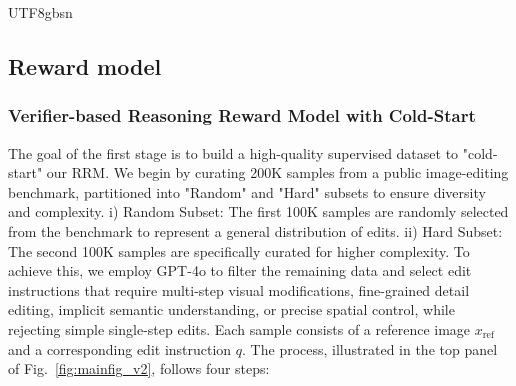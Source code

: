 \documentclass{llmxive}
\begin{document}
\begin{CJK*}{UTF8}{gbsn}


\subsection{Reward model}

\subsubsection{Verifier-based Reasoning Reward Model with Cold-Start}
\label{sec:cold_start_reward}

The goal of the first stage is to build a high-quality supervised dataset to "cold-start" our RRM. We begin by curating 200K samples from a public image-editing benchmark, partitioned into "Random" and "Hard" subsets to ensure diversity and complexity. 
i) Random Subset: The first 100K samples are randomly selected from the benchmark to represent a general distribution of edits. 
ii) Hard Subset: The second 100K samples are specifically curated for higher complexity. To achieve this, we employ GPT-4o to filter the remaining data and select edit instructions that require multi-step visual modifications, fine-grained detail editing, implicit semantic understanding, or precise spatial control, while rejecting simple single-step edits.
Each sample consists of a reference image $x_{\mathrm{ref}}$ and a corresponding edit instruction $q$.
The process, illustrated in the top panel of Fig.~\ref{fig:mainfig_v2}, follows four steps:
\vspace{-1.0em}

\end{CJK*}
\end{document}
